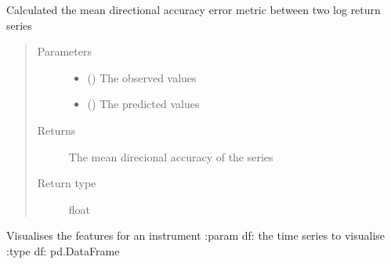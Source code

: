 \documentclass[letterpaper,10pt,english]{sphinxmanual}
\begin{document}
\begin{fulllineitems}
\label{\detokenize{index:Src.utils.mean_directional_accuracy_log_ret}}
Calculated the mean directional accuracy
error metric between two log return series
\begin{quote}\begin{description}
\item[{Parameters}] \leavevmode\begin{itemize}
\item {} 
 () \textendash{} The observed values

\item {} 
 () \textendash{} The predicted values

\end{itemize}

\item[{Returns}] \leavevmode
The mean direcional accuracy of the series

\item[{Return type}] \leavevmode
float

\end{description}\end{quote}

\end{fulllineitems}


\begin{fulllineitems}
\label{\detokenize{index:Src.utils.visualise_df}}
Visualises the features for an instrument
:param df: the time series to visualise
:type df: pd.DataFrame

\end{fulllineitems}

\end{document}
